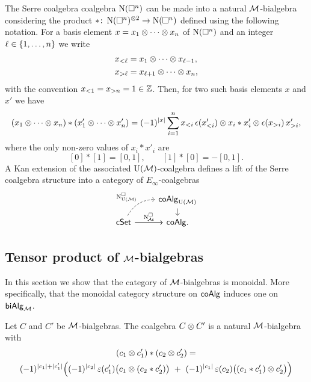 \begin{example}\label{ex:cubical e-infty}
	The Serre coalgebra coalgebra $\operatorname{N}(\square^n)$ can be made into a natural $\mathcal{M}$-bialgebra considering the product $\ast \colon \operatorname{N}(\square^n)^{\otimes 2} \to \operatorname{N}(\square^n)$ defined using the following notation.
	For a basis element $x = x_1 \otimes \dotsb \otimes x_n$ of $\operatorname{N}(\square^n)$ and an integer $\ell \in \{1,\dots,n\}$ we write
	\begin{align*}
		x_{<\ell} & = x_1 \otimes \dotsb \otimes x_{\ell-1}, \\
		x_{>\ell} & = x_{\ell+1} \otimes \dotsb \otimes x_n,
	\end{align*}
	with the convention $x_{<1} = x_{>n} = 1 \in \mathbb{Z}$.
	Then, for two such basis elements $x$ and $x'$ we have
	\begin{multline*}
		(x_1 \otimes \dotsb \otimes x_n) \ast (x'_1 \otimes \dotsb \otimes x'_n)
		=
		(-1)^{|x|} \sum_{i=1}^n x_{<i}\, \epsilon(x'_{<i}) \otimes x_i \ast x'_i \otimes \epsilon(x_{>i}) \, x'_{>i},
	\end{multline*}
	where the only non-zero values of $x_i \ast x'_i$ are
	\[
	[0] \ast [1] = [0, 1], \qquad [1] \ast [0] = -[0, 1].
	\]
	A Kan extension of the associated ${\operatorname{U}(\mathcal{M})}$-coalgebra defines a lift of the Serre coalgebra structure into a category of $E_\infty$-coalgebras
	\begin{equation}\label{eq:lift to e-infty cubical}
		\begin{tikzcd}[column sep=normal, row sep=small]
			& \coAlg_{\UM} \arrow[d] \\
			\cSet \arrow[r]
			\arrow[ur,out=60, in=180, dashed, "\cchainsUM"]
			\arrow[r, "\cchainsA"]
			& \coAlg.
		\end{tikzcd}
	\end{equation}
\end{example}

\subsection{Tensor product of $\mathcal{M}$-bialgebras}

In this section we show that the category of $\mathcal{M}$-bialgebras is monoidal.
More specifically, that the monoidal category structure on $\mathsf{coAlg}$ induces one on $\mathsf{biAlg}_{\mathcal{M}}$.

\begin{lemma}
	Let $C$ and $C'$ be $\mathcal{M}$-bialgebras.
	The coalgebra $C \otimes C'$ is a natural $\mathcal{M}$-bialgebra with
	\begin{multline}\label{eq:monoidal_product}
		(c_1 \otimes c_1') \ast (c_2 \otimes c'_2) = \\
		(-1)^{\lvert c_1\rvert + \lvert c'_1\rvert}
		\Big(
		(-1)^{\lvert c_2\rvert} \operatorname{\varepsilon}(c'_1) \big(c_1 \otimes (c_2 \ast c'_2)\big)
		\ + \
		(-1)^{\lvert c_1\rvert} \operatorname{\varepsilon}(c_2) \big((c_1 \ast c'_1) \otimes c'_2\big)
		\Big)
	\end{multline}
\end{lemma}

